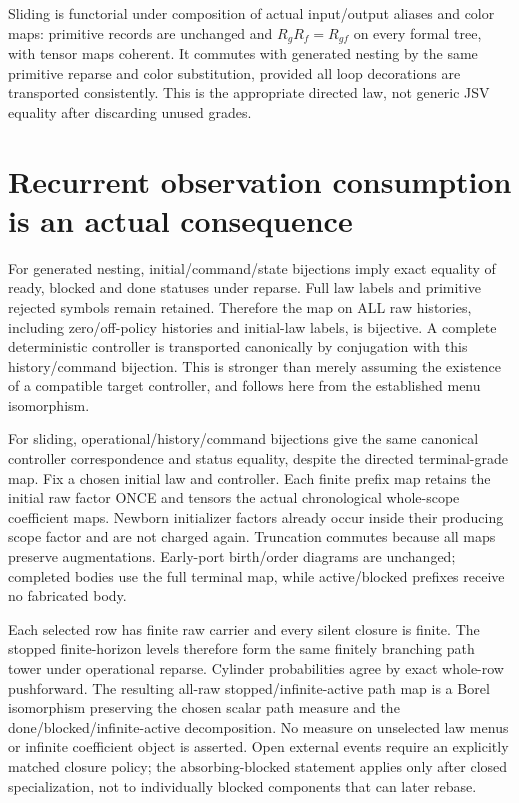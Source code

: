 \documentclass[11pt]{article}
\begin{document}
Sliding is functorial under composition of actual input/output aliases and color maps: primitive records are unchanged and $R_gR_f=R_{gf}$ on every formal tree, with tensor maps coherent. It commutes with generated nesting by the same primitive reparse and color substitution, provided all loop decorations are transported consistently. This is the appropriate directed law, not generic JSV equality after discarding unused grades.

\section{Recurrent observation consumption is an actual consequence}
For generated nesting, initial/command/state bijections imply exact equality of ready, blocked and done statuses under reparse. Full law labels and primitive rejected symbols remain retained. Therefore the map on ALL raw histories, including zero/off-policy histories and initial-law labels, is bijective. A complete deterministic controller is transported canonically by conjugation with this history/command bijection. This is stronger than merely assuming the existence of a compatible target controller, and follows here from the established menu isomorphism.

For sliding, operational/history/command bijections give the same canonical controller correspondence and status equality, despite the directed terminal-grade map. Fix a chosen initial law and controller. Each finite prefix map retains the initial raw factor ONCE and tensors the actual chronological whole-scope coefficient maps. Newborn initializer factors already occur inside their producing scope factor and are not charged again. Truncation commutes because all maps preserve augmentations. Early-port birth/order diagrams are unchanged; completed bodies use the full terminal map, while active/blocked prefixes receive no fabricated body.

Each selected row has finite raw carrier and every silent closure is finite. The stopped finite-horizon levels therefore form the same finitely branching path tower under operational reparse. Cylinder probabilities agree by exact whole-row pushforward. The resulting all-raw stopped/infinite-active path map is a Borel isomorphism preserving the chosen scalar path measure and the done/blocked/infinite-active decomposition. No measure on unselected law menus or infinite coefficient object is asserted. Open external events require an explicitly matched closure policy; the absorbing-blocked statement applies only after closed specialization, not to individually blocked components that can later rebase.
\end{document}
